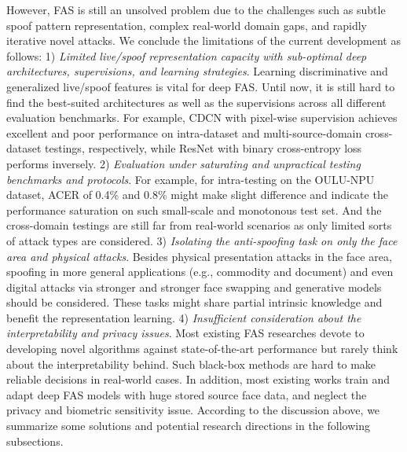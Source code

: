 \documentclass[10pt,journal,compsoc]{IEEEtran}
\begin{document}
However, FAS is still an unsolved problem due to the challenges such as subtle spoof pattern representation, complex real-world domain gaps, and rapidly iterative novel attacks. We conclude the limitations of the current development as follows: 1) \textit{Limited live/spoof representation capacity with sub-optimal deep architectures, supervisions, and learning strategies}. Learning discriminative and generalized live/spoof features is vital for deep FAS. Until now, it is still hard to find the best-suited architectures as well as the supervisions across all different evaluation benchmarks. For example, CDCN with pixel-wise supervision achieves excellent and poor performance on intra-dataset and multi-source-domain cross-dataset testings, respectively, while ResNet with binary cross-entropy loss performs inversely. 2) \textit{Evaluation under saturating and unpractical testing benchmarks and protocols}. For example, for intra-testing on the OULU-NPU dataset, ACER of 0.4\% and 0.8\% might make slight difference and indicate the performance saturation on such small-scale and monotonous test set. And the cross-domain testings are still far from real-world scenarios as only limited sorts of attack types are considered. 3) \textit{Isolating the anti-spoofing task on only the face area and physical attacks}. Besides physical presentation attacks in the face area, spoofing in more general applications (e.g., commodity and document) and even digital attacks via stronger and stronger face swapping and generative models should be considered. These tasks might share partial intrinsic knowledge and benefit the representation learning. 4) \textit{Insufficient consideration about the interpretability and privacy issues}. Most existing FAS researches devote to developing novel algorithms 
against state-of-the-art performance but rarely think about the interpretability behind. Such black-box methods are hard to make reliable decisions in real-world cases. In addition, most existing works train and adapt deep FAS models with huge stored source face data, and neglect the privacy and biometric sensitivity issue. According to the discussion above, we summarize some solutions and potential research directions in the following subsections.









\vspace{-0.3em}
\end{document}
